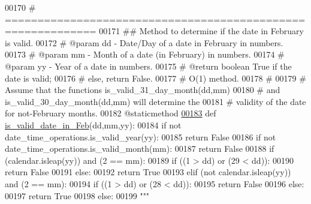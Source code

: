 \begin{DoxyCode}
00170     \textcolor{comment}{# ============================================================}
00171     \textcolor{comment}{##  Method to determine if the date in February is valid.}
00172     \textcolor{comment}{#   @param dd - Date/Day of a date in February in numbers.}
00173     \textcolor{comment}{#   @param mm - Month of a date (in February) in numbers.}
00174     \textcolor{comment}{#   @param yy - Year of a date in numbers.}
00175     \textcolor{comment}{#   @return boolean True if the date is valid;}
00176     \textcolor{comment}{#       else, return False.}
00177     \textcolor{comment}{#   O(1) method.}
00178     \textcolor{comment}{#}
00179     \textcolor{comment}{#   Assume that the functions is\_valid\_31\_day\_month(dd,mm)}
00180     \textcolor{comment}{#       and is\_valid\_30\_day\_month(dd,mm) will determine the}
00181     \textcolor{comment}{#       validity of the date for not-February months.}
00182     @staticmethod
\hypertarget{date__time__processing_8py_source_l00183}{}\hyperlink{classutilities_1_1date__time__processing_1_1date__time__operations_a659b5810ce55e7bbb18820664ef97d83}{00183}     \textcolor{keyword}{def }\hyperlink{classutilities_1_1date__time__processing_1_1date__time__operations_a659b5810ce55e7bbb18820664ef97d83}{is\_valid\_date\_in\_Feb}(dd,mm,yy):
00184         \textcolor{keywordflow}{if} \textcolor{keywordflow}{not} date\_time\_operations.is\_valid\_year(yy):
00185             \textcolor{keywordflow}{return} \textcolor{keyword}{False}
00186         \textcolor{keywordflow}{if} \textcolor{keywordflow}{not} date\_time\_operations.is\_valid\_month(mm):
00187             \textcolor{keywordflow}{return} \textcolor{keyword}{False}
00188         \textcolor{keywordflow}{if} (calendar.isleap(yy)) \textcolor{keywordflow}{and} (2 == mm):
00189             \textcolor{keywordflow}{if} ((1 > dd) \textcolor{keywordflow}{or} (29 < dd)):
00190                 \textcolor{keywordflow}{return} \textcolor{keyword}{False}
00191             \textcolor{keywordflow}{else}:
00192                 \textcolor{keywordflow}{return} \textcolor{keyword}{True}
00193         \textcolor{keywordflow}{elif} (\textcolor{keywordflow}{not} calendar.isleap(yy)) \textcolor{keywordflow}{and} (2 == mm):
00194             \textcolor{keywordflow}{if} ((1 > dd) \textcolor{keywordflow}{or} (28 < dd)):
00195                 \textcolor{keywordflow}{return} \textcolor{keyword}{False}
00196             \textcolor{keywordflow}{else}:
00197                 \textcolor{keywordflow}{return} \textcolor{keyword}{True}
00198         \textcolor{keywordflow}{else}:
00199             \textcolor{stringliteral}{"""}

\end{DoxyCode}
